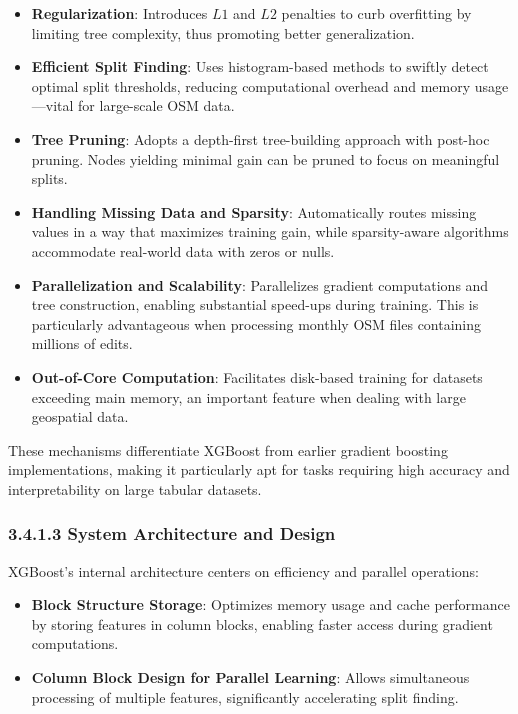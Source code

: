 \documentclass[
    13pt, %
    a4paper, %
    listof=totoc, %
    bibliography=totoc, %
    index=totoc, %
    headsepline
]{scrreprt}
\begin{document}
\begin{itemize}
    \item \textbf{Regularization}: 
    Introduces $L1$ and $L2$ penalties to curb overfitting by limiting tree complexity, thus promoting better generalization.

    \item \textbf{Efficient Split Finding}: 
    Uses histogram-based methods to swiftly detect optimal split thresholds, reducing computational overhead and memory usage—vital for large-scale OSM data.

    \item \textbf{Tree Pruning}: 
    Adopts a depth-first tree-building approach with post-hoc pruning. Nodes yielding minimal gain can be pruned to focus on meaningful splits.

    \item \textbf{Handling Missing Data and Sparsity}: 
    Automatically routes missing values in a way that maximizes training gain, while sparsity-aware algorithms accommodate real-world data with zeros or nulls.

    \item \textbf{Parallelization and Scalability}: 
    Parallelizes gradient computations and tree construction, enabling substantial speed-ups during training. This is particularly advantageous when processing monthly OSM files containing millions of edits.

    \item \textbf{Out-of-Core Computation}: 
    Facilitates disk-based training for datasets exceeding main memory, an important feature when dealing with large geospatial data.
\end{itemize}

\noindent
These mechanisms differentiate XGBoost from earlier gradient boosting implementations, making it particularly apt for tasks requiring high accuracy and interpretability on large tabular datasets.

\subsubsection{3.4.1.3 System Architecture and Design}
\label{sec:xgboost_architecture}

\noindent
XGBoost’s internal architecture centers on efficiency and parallel operations:

\begin{itemize}
    \item \textbf{Block Structure Storage}: 
    Optimizes memory usage and cache performance by storing features in column blocks, enabling faster access during gradient computations.

    \item \textbf{Column Block Design for Parallel Learning}: 
    Allows simultaneous processing of multiple features, significantly accelerating split finding.

\end{itemize}
\end{document}
